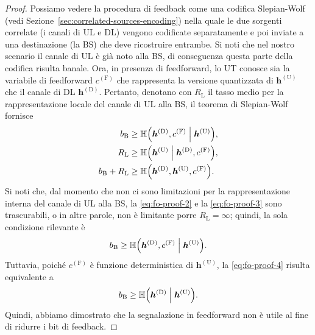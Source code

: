 \begin{proof}
    Possiamo vedere la procedura di feedback come una codifica Slepian-Wolf
    (vedi Sezione~\ref{sec:correlated-sources-encoding}) nella quale le due
    sorgenti correlate (i canali di UL e DL) vengono codificate separatamente e
    poi inviate a una destinazione (la BS) che deve ricostruire entrambe. Si
    noti che nel nostro scenario il canale di UL è già noto alla BS, di
    conseguenza questa parte della codifica risulta banale. Ora, in presenza
    di feedforward, lo UT conosce sia la variabile di feedforward
    \(c^\mathrm{(F)}\) che rappresenta la versione quantizzata di
    \(\bm{h}^\mathrm{(U)}\) che il canale di DL \(\bm{h}^\mathrm{(D)}\).
    Pertanto, denotano con \(R_\mathrm{L}\) il tasso medio per la
    rappresentazione locale del canale di UL alla BS, il teorema di
    Slepian-Wolf fornisce
    \begin{alignat}{1}
        b_\mathrm{B} &\ge \entropy{
            \bm{h}^\mathrm{(D)},c^\mathrm{(F)} \given \bm{h}^\mathrm{(U)}
        }, \label{eq:fo-proof-1} \\
        R_\mathrm{L} &\ge \entropy{
            \bm{h}^\mathrm{(U)} \given \bm{h}^\mathrm{(D)},c^\mathrm{(F)}
        }, \label{eq:fo-proof-2} \\
        b_\mathrm{B} + R_\mathrm{L} &\ge \entropy{
            \bm{h}^\mathrm{(D)},\bm{h}^\mathrm{(U)},c^\mathrm{(F)}
        }. \label{eq:fo-proof-3}
    \end{alignat}
    Si noti che, dal momento che non ci sono limitazioni per la
    rappresentazione interna del canale di UL alla BS, la \eqref{eq:fo-proof-2}
    e la \eqref{eq:fo-proof-3} sono trascurabili, o in altre parole, non è
    limitante porre \(R_\mathrm{L} = \infty\); quindi, la sola condizione
    rilevante è
    \begin{equation}
        \label{eq:fo-proof-4}
        b_\mathrm{B} \ge \entropy{
            \bm{h}^\mathrm{(D)},c^\mathrm{(F)} \given \bm{h}^\mathrm{(U)}
        }.
    \end{equation}
    Tuttavia, poiché \(c^\mathrm{(F)}\) è funzione deterministica di
    \(\bm{h}^\mathrm{(U)}\), la \eqref{eq:fo-proof-4} risulta equivalente a
    \begin{equation}
        \label{eq:fo-proof-5}
        b_\mathrm{B} \ge \entropy{
            \bm{h}^\mathrm{(D)} \given \bm{h}^\mathrm{(U)}
        }.
    \end{equation}
    Quindi, abbiamo dimostrato che la segnalazione in feedforward non è utile
    al fine di ridurre i bit di feedback.
\end{proof}

